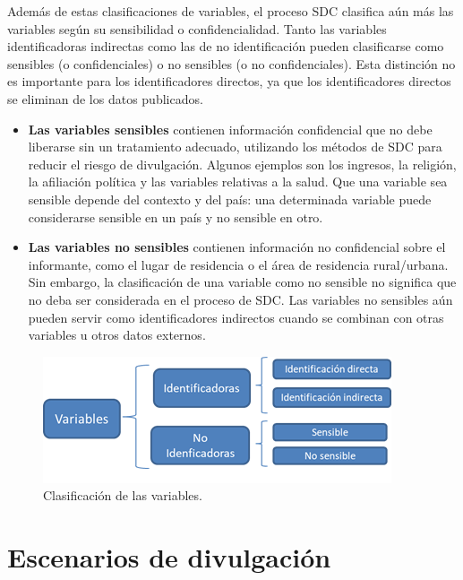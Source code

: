 \documentclass[]{book}
\theoremstyle{definition}
\theoremstyle{definition}
\theoremstyle{definition}
\theoremstyle{definition}
\theoremstyle{remark}
\begin{document}
Además de estas clasificaciones de variables, el proceso SDC clasifica aún más las variables según su sensibilidad o confidencialidad. Tanto las variables identificadoras indirectas como las de no identificación pueden clasificarse como sensibles (o confidenciales) o no sensibles (o no confidenciales). Esta distinción no es importante para los identificadores directos, ya que los identificadores directos se eliminan de los datos publicados.

\begin{itemize}
\item
  \textbf{Las variables sensibles} contienen información confidencial que no debe liberarse sin un tratamiento adecuado, utilizando los métodos de SDC para reducir el riesgo de divulgación. Algunos ejemplos son los ingresos, la religión, la afiliación política y las variables relativas a la salud. Que una variable sea sensible depende del contexto y del país: una determinada variable puede considerarse sensible en un país y no sensible en otro.
\item
  \textbf{Las variables no sensibles} contienen información no confidencial sobre el informante, como el lugar de residencia o el área de residencia rural/urbana. Sin embargo, la clasificación de una variable como no sensible no significa que no deba ser considerada en el proceso de SDC. Las variables no sensibles aún pueden servir como identificadores indirectos cuando se combinan con otras variables u otros datos externos.
\end{itemize}

\begin{figure}

{\centering \includegraphics[width=0.6\linewidth]{Imagenes/clasi_vars} 

}

\caption{Clasificación de las variables.}\label{fig:clasVars}
\end{figure}

\hypertarget{escenarios-de-divulgaciuxf3n}{%
\section{Escenarios de divulgación}\label{escenarios-de-divulgaciuxf3n}}
\end{document}
